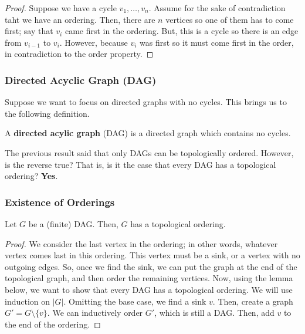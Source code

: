 \documentclass[letterpaper]{article}
\begin{document}
\begin{mdframed}[]
    \begin{proof}
        Suppose we have a cycle $v_1, \dots, v_n$. Assume for the sake of contradiction taht we have an ordering. Then, there are $n$ vertices so one of them has to come first; say that $v_i$ came first in the ordering. But, this is a cycle so there is an edge from $v_{i - 1}$ to $v_i$. However, because $v_i$ was first so it must come first in the order, in contradiction to the order property. 
    \end{proof}
\end{mdframed}

\subsubsection{Directed Acyclic Graph (DAG)}
Suppose we want to focus on directed graphs with no cycles. This brings us to the following definition.
\begin{definition}{}{}
    A \textbf{directed acylic graph} (DAG) is a directed graph which contains no cycles. 
\end{definition}

The previous result said that only DAGs can be topologically ordered. However, is the reverse true? That is, is it the case that every DAG has a topological ordering? \textbf{Yes}. 

\subsubsection{Existence of Orderings}
\begin{theorem}{}{}
    Let $G$ be a (finite) DAG. Then, $G$ has a topological ordering.
\end{theorem}

\begin{mdframed}[]
    \begin{proof}
        We consider the last vertex in the ordering; in other words, whatever vertex comes last in this ordering. This vertex must be a sink, or a vertex with no outgoing edges. So, once we find the sink, we can put the graph at the end of the topological graph, and then order the remaining vertices. Now, using the lemma below, we want to show that every DAG has a topological ordering. We will use induction on $|G|$. Omitting the base case, we find a sink $v$. Then, create a graph $G' = G \setminus \{v\}$. We can inductively order $G'$, which is still a DAG. Then, add $v$ to the end of the ordering. 
    \end{proof}
\end{mdframed}
\end{document}
